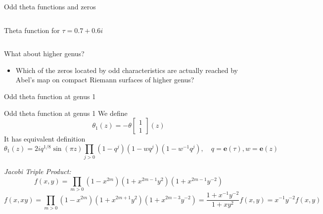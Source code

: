 \documentclass[11pt,aspectratio=169]{beamer}
\newcommand{\ee}[0]{\mathbf{e}}
\begin{document}
\begin{frame}{Odd theta functions and zeros}
\begin{columns}[onlytextwidth]
\begin{column}{0.45\textwidth}
            \tiny Theta function for $\tau = 0.7+0.6i$
            
            \cite{Cha22}
        \end{column}
    \end{columns}

    \pause{}

    {
        \begin{block}{What about higher genus?}
            \begin{itemize}
                \item Which of the zeros located by odd characteristics are actually reached by Abel's map on compact Riemann surfaces of higher genus?
            \end{itemize}
        \end{block}
    }
\end{frame}

\begin{frame}{Odd theta function at genus 1}
    \begin{block}{Odd theta function at genus 1}
        We define
        \[\theta_1(z) = -\theta \begin{bmatrix} 1 \\ 1 \end{bmatrix}(z)\]
        It has equivalent definition
        \[\theta_1(z) = 2iq^{1/8} \sin(\pi z) \prod_{j>0} (1-q^j) (1-wq^j)(1-w^{-1}q^j) , \quad q=\ee(\tau),w=\ee(z)\]
    \end{block}

    \pause{}

    \emph{Jacobi Triple Product:}
    \[f(x,y) = \prod_{m>0} (1-x^{2m})(1+x^{2m-1}y^2)(1+x^{2m-1}y^{-2})\]
    \[f(x,xy) = \prod_{m>0} (1-x^{2m})(1+x^{2m+1}y^2)(1+x^{2m-3}y^{-2}) = \frac{1+x^{-1}y^{-2}}{1+xy^2} f(x,y) = x^{-1}y^{-2}f(x,y)\]
\end{frame}
\end{document}
